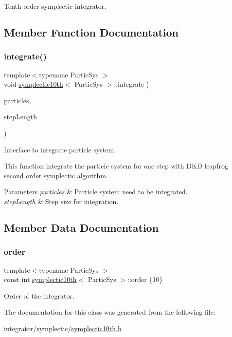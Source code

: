 Tenth order symplectic integrator. 

\subsection{Member Function Documentation}
\mbox{\label{classsymplectic10th_a6fd1d57c1504d7a603056ca021b179b0}} 
\subsubsection{\texorpdfstring{integrate()}{integrate()}}
{\footnotesize\ttfamily template$<$typename Partic\+Sys $>$ \\
void \mbox{\hyperlink{classsymplectic10th}{symplectic10th}}$<$ Partic\+Sys $>$\+::integrate (\begin{DoxyParamCaption}\item[{Partic\+Sys \&}]{particles,  }\item[{double}]{step\+Length }\end{DoxyParamCaption})}



Interface to integrate particle system. 

This function integrate the particle system for one step with D\+KD leapfrog second order symplectic algorithm. 
\begin{DoxyParams}{Parameters}
{\em particles} & Particle system need to be integrated. \\
\hline
{\em step\+Length} & Step size for integration. \\
\hline
\end{DoxyParams}


\subsection{Member Data Documentation}
\mbox{\label{classsymplectic10th_af1cb88e94e3022b5bf90091d03c609a4}} 
\subsubsection{\texorpdfstring{order}{order}}
{\footnotesize\ttfamily template$<$typename Partic\+Sys $>$ \\
const int \mbox{\hyperlink{classsymplectic10th}{symplectic10th}}$<$ Partic\+Sys $>$\+::order \{10\}\hspace{0.3cm}{\ttfamily [static]}}



Order of the integrator. 



The documentation for this class was generated from the following file\+:\begin{DoxyCompactItemize}
\item 
integrator/symplectic/\mbox{\hyperlink{symplectic10th_8h}{symplectic10th.\+h}}\end{DoxyCompactItemize}
